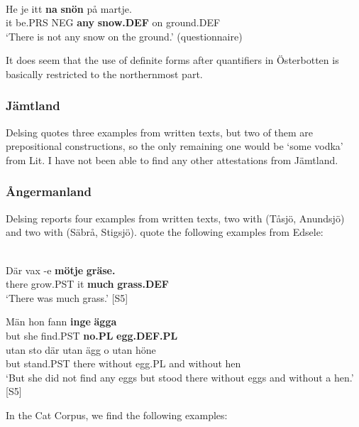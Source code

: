 \ea \label{} 
\\
\gll He  je  itt  \textbf{na} \textbf{snön} på  martje.\\
it  be.PRS  NEG  \textbf{any} \textbf{snow.DEF} on  ground.DEF\\
\glt ‘There is not any snow on the ground.’ (questionnaire)

\z

It does seem that the use of definite forms after quantifiers in Österbotten is basically restricted to the northernmost part.

\subsubsection{Jämtland}
Delsing quotes three examples from written texts, but two of them are prepositional constructions, so the only remaining one would be  ‘some vodka’ from Lit. I have not been able to find any other attestations from Jämtland.

\subsubsection{Ångermanland}
 Delsing reports four examples from written texts, two with  (Tåsjö, Anundsjö) and two with (Säbrå, Stigsjö). \citet{WälchliEtAl1998} quote the following examples from Edsele:

\ea\label{}
\\
\gll Där  vax  {}-e  \textbf{mötje} \textbf{  gräse.}\\
there  grow.PST  it  \textbf{much} \textbf{grass.DEF}\\
\glt ‘There was much grass.’ [S5]

\z

\ea
\gll Män  hon  fann  \textbf{inge} \textbf{ägga}\\
but  she  find.PST  \textbf{no.PL} \textbf{egg.DEF.PL}\\
\gll utan  sto  där  utan  ägg  o  utan  höne\\
but  stand.PST  there  without  egg.PL  and  without  hen\\
\glt ‘But she did not find any eggs but stood there without eggs and without a hen.’ [S5]

\z

In the Cat Corpus, we find the following examples:

